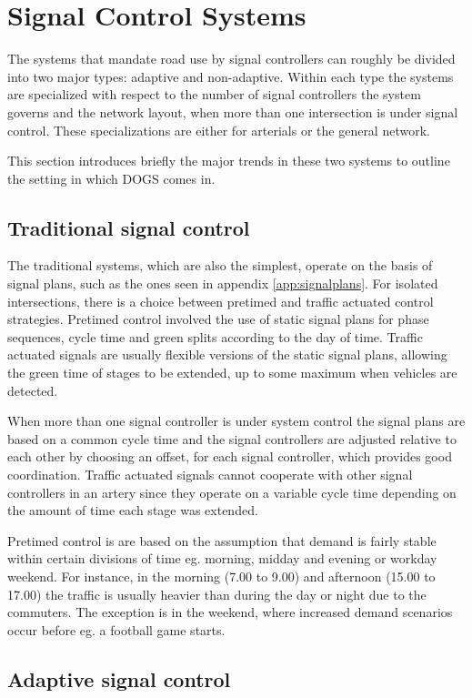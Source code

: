 \section{Signal Control Systems}
The systems that mandate road use by signal controllers can roughly be divided into two major types: adaptive and non-adaptive. Within each type the systems are specialized with respect to the number of signal controllers the system governs and the network layout, when more than one intersection is under signal control. These specializations are either for arterials or the general network.

This section introduces briefly the major trends in these two systems to outline the setting in which DOGS comes in.

\subsection{Traditional signal control}

The traditional systems, which are also the simplest, operate on the basis of signal plans, such as the ones seen in appendix \ref{app:signalplans}. For isolated intersections, there is a choice between pretimed and traffic actuated control strategies. Pretimed control involved the use of static signal plans for phase sequences, cycle time and green splits according to the day of time. Traffic actuated signals are usually flexible versions of the static signal plans, allowing the green time of stages to be extended, up to some maximum when vehicles are detected.

When more than one signal controller is under system control the signal plans are based on a common cycle time and the signal controllers are adjusted relative to each other by choosing an offset, for each signal controller, which provides good coordination. Traffic actuated signals cannot cooperate with other signal controllers in an artery since they operate on a variable cycle time depending on the amount of time each stage was extended.

Pretimed control is are based on the assumption that demand is fairly stable within certain divisions of time eg. morning, midday and evening or workday \/ weekend. For instance, in the morning (7.00 to 9.00) and afternoon (15.00 to 17.00) the traffic is usually heavier than during the day or night due to the commuters. The exception is in the weekend, where increased demand scenarios occur before eg. a football game starts.

\subsection{Adaptive signal control}

